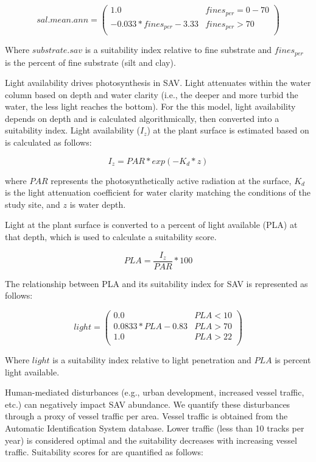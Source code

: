 \documentclass[
]{book}
\begin{document}
\[sal.mean.ann = \begin{pmatrix} 1.0 & fines_{per}=0-70\\
-0.033*fines_{per}-3.33 & fines_{per}>70\\
\end{pmatrix}\]

Where \(substrate.sav\) is a suitability index relative to fine substrate and \(fines_{per}\) is the percent of fine substrate (silt and clay).

Light availability drives photosynthesis in SAV. Light attenuates within the water column based on depth and water clarity (i.e., the deeper and more turbid the water, the less light reaches the bottom). For the this model, light availability depends on depth and is calculated algorithmically, then converted into a suitability index. Light availability (\(I_{z}\)) at the plant surface is estimated based on \citet{van_nes_charisma_2003} is calculated as follows:

\[I_{z} = PAR * exp(-K_{d}*z)\]

where \(PAR\) represents the photosynthetically active radiation at the surface, \(K_{d}\) is the light attenuation coefficient for water clarity matching the conditions of the study site, and \(z\) is water depth.

Light at the plant surface is converted to a percent of light available (PLA) at that depth, which is used to calculate a suitability score.

\[PLA = \frac{I_{z}}{PAR} * 100\]

The relationship between PLA and its suitability index for SAV is represented as follows:

\[light = \begin{pmatrix} 0.0 & PLA<10\\
0.0833*PLA-0.83 & PLA>70\\
1.0 & PLA>22\\
\end{pmatrix}\]

Where \(light\) is a suitability index relative to light penetration and \(PLA\) is percent light available.

Human-mediated disturbances (e.g., urban development, increased vessel traffic, etc.) can negatively impact SAV abundance. We quantify these disturbances through a proxy of vessel traffic per area. Vessel traffic is obtained from the Automatic Identification System database. Lower traffic (less than 10 tracks per year) is considered optimal and the suitability decreases with increasing vessel traffic. Suitability scores for are quantified as follows:
\end{document}
